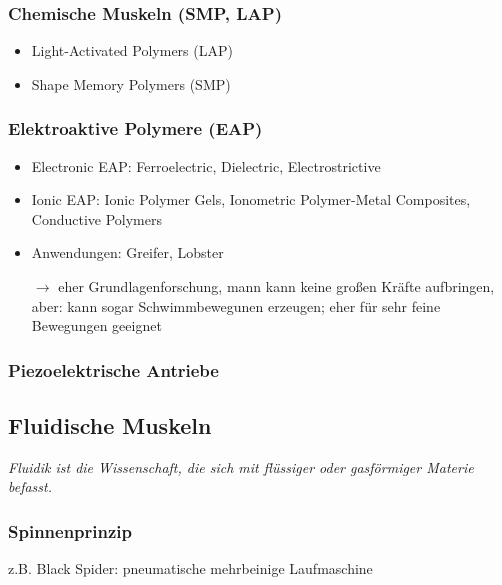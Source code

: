 \subsubsection{Chemische Muskeln (SMP, LAP)}
\begin{itemize}
	\item Light-Activated Polymers (LAP)
	\item Shape Memory Polymers (SMP)
\end{itemize}
\subsubsection{Elektroaktive Polymere (EAP)}
\begin{itemize}
	\item Electronic EAP: Ferroelectric, Dielectric, Electrostrictive
	\item Ionic EAP: Ionic Polymer Gels, Ionometric Polymer-Metal Composites, Conductive Polymers
	\item Anwendungen: Greifer, Lobster
	\item [$\rightarrow$] eher Grundlagenforschung, mann kann keine großen Kräfte aufbringen, aber: kann sogar Schwimmbewegunen erzeugen; eher für sehr feine Bewegungen geeignet
\end{itemize}
\subsubsection{Piezoelektrische Antriebe}
\subsection{Fluidische Muskeln}
\emph{Fluidik ist die Wissenschaft, die sich mit flüssiger oder gasförmiger Materie befasst.}
\subsubsection{Spinnenprinzip}
z.B. \glqq Black Spider\grqq : pneumatische mehrbeinige Laufmaschine
